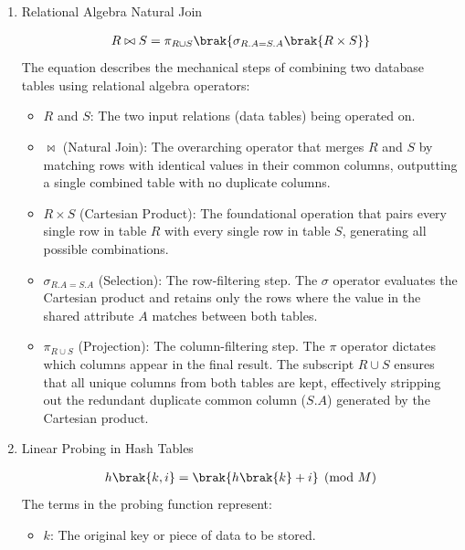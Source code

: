 \begin{enumerate}[label=\thesubsection.\arabic*, ref=\thesubsection.\theenumi]
	\item Relational Algebra Natural Join
	
	\begin{align}
		R \bowtie S = \pi_{R \cup S}\brak{\sigma_{R.A = S.A}\brak{R \times S}} \label{eq:DA2025-join}
	\end{align}
	\solution
	The equation describes the mechanical steps of combining two database tables using relational algebra operators:
	\begin{itemize}
		\item $R$ and $S$: The two input relations (data tables) being operated on.
		\item $\bowtie$ (Natural Join): The overarching operator that merges $R$ and $S$ by matching rows with identical values in their common columns, outputting a single combined table with no duplicate columns.
		\item $R \times S$ (Cartesian Product): The foundational operation that pairs every single row in table $R$ with every single row in table $S$, generating all possible combinations.
		\item $\sigma_{R.A = S.A}$ (Selection): The row-filtering step. The $\sigma$ operator evaluates the Cartesian product and retains only the rows where the value in the shared attribute $A$ matches between both tables.
		\item $\pi_{R \cup S}$ (Projection): The column-filtering step. The $\pi$ operator dictates which columns appear in the final result. The subscript $R \cup S$ ensures that all unique columns from both tables are kept, effectively stripping out the redundant duplicate common column ($S.A$) generated by the Cartesian product.
	\end{itemize}
	\item Linear Probing in Hash Tables
	
	\begin{align}
		h\brak{k, i} = \brak{h\brak{k} + i} \pmod M \label{eq:DA2025-probing}
	\end{align}
	The terms in the probing function represent:
	\begin{itemize}
		\item $k$: The original key or piece of data to be stored.

\end{itemize}
\end{enumerate}
